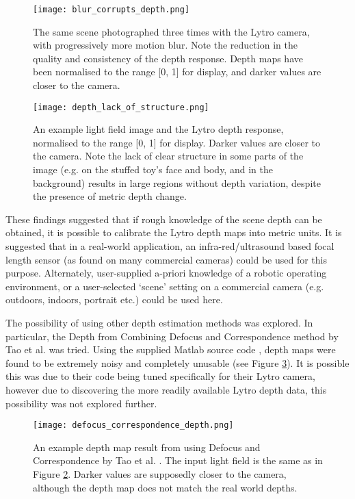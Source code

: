 \begin{figure}
\centering
\texttt{[image: blur\_corrupts\_depth.png]}
\caption[Motion Blur Corrupts Lytro Depth Estimation]{
The same scene photographed three times with the Lytro camera, with progressively more motion blur.
Note the reduction in the quality and consistency of the depth response.
Depth maps have been normalised to the range [0, 1] for display, and darker values are closer to the camera.
}
\label{fig:blur_corrupts_depth}
\end{figure}

\begin{figure}
\centering
\texttt{[image: depth\_lack\_of\_structure.png]}
\caption[Lack of Scene Structure Corrupts Lytro Depth Estimation]{
An example light field image and the Lytro depth response, normalised to the range [0, 1] for display.
Darker values are closer to the camera.
Note the lack of clear structure in some parts of the image (e.g. on the stuffed toy's face and body, and in the background) results in large regions without depth variation, despite the presence of metric depth change.
}
\label{fig:depth_lack_of_structure}
\end{figure}

These findings suggested that if rough knowledge of the scene depth can be obtained, it is possible to calibrate the Lytro depth maps into metric units.
It is suggested that in a real-world application, an infra-red/ultrasound based focal length sensor (as found on many commercial cameras) could be used for this purpose.
Alternately, user-supplied a-priori knowledge of a robotic operating environment, or a user-selected \enquote*{scene} setting on a commercial camera (e.g. outdoors, indoors, portrait etc.) could be used here.

The possibility of using other depth estimation methods was explored.
In particular, the Depth from Combining Defocus and Correspondence method by Tao et al. \cite{tao2013depth} was tried.
Using the supplied Matlab source code \cite{tao2013depthwebsite}, depth maps were found to be extremely noisy and completely unusable (see Figure \ref{fig:defocus_correspondence_depth}).
It is possible this was due to their code being tuned specifically for their Lytro camera, however due to discovering the more readily available Lytro depth data, this possibility was not explored further.


\begin{figure}[!h]
\centering
\texttt{[image: defocus\_correspondence\_depth.png]}
\caption[Depth Map from combining Defocus and Correspondence]{
An example depth map result from using Defocus and Correspondence by Tao et al. \cite{tao2013depthwebsite}.
The input light field is the same as in Figure \ref{fig:depth_lack_of_structure}.
Darker values are supposedly closer to the camera, although the depth map does not match the real world depths.
}
\label{fig:defocus_correspondence_depth}
\end{figure}
